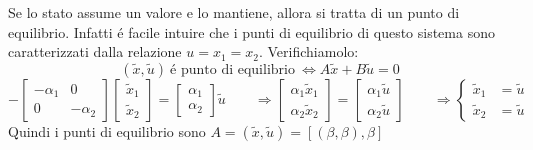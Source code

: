 \documentclass[../main.tex]{subfiles}
\begin{document}
\begin{Exercise}[title={Studiare la controllabilit\'a di due rami RC in parallelo}, difficulty=3]
			Se lo stato assume un valore e lo mantiene, allora si tratta di un punto di equilibrio. Infatti \'e facile intuire che i punti di equilibrio di questo sistema sono caratterizzati dalla relazione $ u = x_1 = x_2 $. Verifichiamolo:
			\[ (\tilde x, \tilde u)\ \text{\'e punto di equilibrio}\ \Leftrightarrow A\tilde x + B \tilde u = 0 \]
			\[
				-\begin{bmatrix}
					-\alpha_1 & 0\\
					0 & -\alpha_2
				\end{bmatrix}
				\begin{bmatrix}
					\tilde x_1\\
					\tilde x_2
				\end{bmatrix} =
				\begin{bmatrix}
					\alpha_1\\
					\alpha_2
				\end{bmatrix} \tilde u \qquad\Rightarrow
				\begin{bmatrix}
					\alpha_1 \tilde x_1\\
					\alpha_2 \tilde x_2
				\end{bmatrix} =
				\begin{bmatrix}
					\alpha_1 \tilde u\\
					\alpha_2 \tilde u
				\end{bmatrix} \qquad\Rightarrow
				\begin{cases}
					\tilde x_1 &= \tilde u\\
					\tilde x_2 &= \tilde u
				\end{cases}
			\]
			Quindi i punti di equilibrio sono $ A = (\tilde x, \tilde u) = \left[ (\beta, \beta), \beta \right] $
		\end{Exercise}
	
\end{document}
